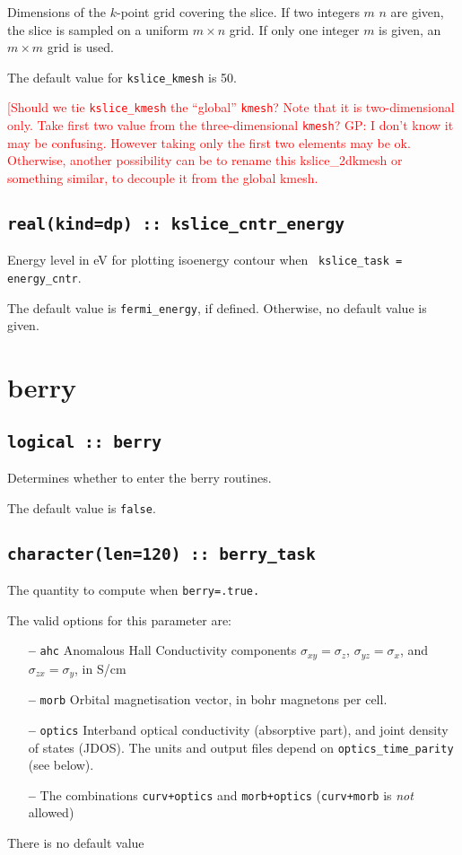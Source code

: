 Dimensions of the $k$-point grid covering the slice.
If two integers $m$ $n$ are given, the slice is sampled on a uniform
$m\times n$ grid.  If only one integer $m$ is given, an $m\times m$
grid is used.

The default value for \verb#kslice_kmesh# is 50.

\textcolor{red}{{[Should we tie {\tt kslice\_kmesh} the ``global''
{\tt kmesh}? Note that it is two-dimensional only. Take first
two value from the three-dimensional {\tt kmesh}? GP: I don't know it may be confusing. However taking only the first two elements may be ok. Otherwise, another possibility can be to rename this kslice\_2dkmesh or something similar, to decouple it from the global kmesh.}}


\subsection[kslice\_cntr\_energy]{\tt real(kind=dp) :: kslice\_cntr\_energy}

Energy level in eV for plotting isoenergy contour when {\tt
  kslice\_task = energy\_cntr}.

The default value is {\tt fermi\_energy}, if defined. Otherwise, no
default value is given.

\clearpage
\section{berry}

\subsection[berry]{\tt logical :: berry}
Determines whether to enter the berry routines.

The default value is \verb#false#.


\subsection[berry\_task]{\tt character(len=120) ::  berry\_task}
The quantity to compute when {\tt berry=.true.}

The valid options for this parameter are:
\begin{itemize}
\item[{\bf --}] \verb#ahc# Anomalous Hall Conductivity components
  $\sigma_{xy}=\sigma_z$, $\sigma_{yz}=\sigma_x$, and
  $\sigma_{zx}=\sigma_y$, in S/cm
\item[{\bf --}]  \verb#morb# Orbital magnetisation vector, in bohr magnetons per cell.

\item[{\bf --}] \verb#optics# Interband optical conductivity
  (absorptive part), and joint density of states (JDOS).  The units and output
  files depend on {\tt optics\_time\_parity} (see below).

\item[{\bf --}] The combinations {\tt curv+optics} and {\tt morb+optics}
({\tt curv+morb} is {\it not} allowed)

\end{itemize}
There is no default value


